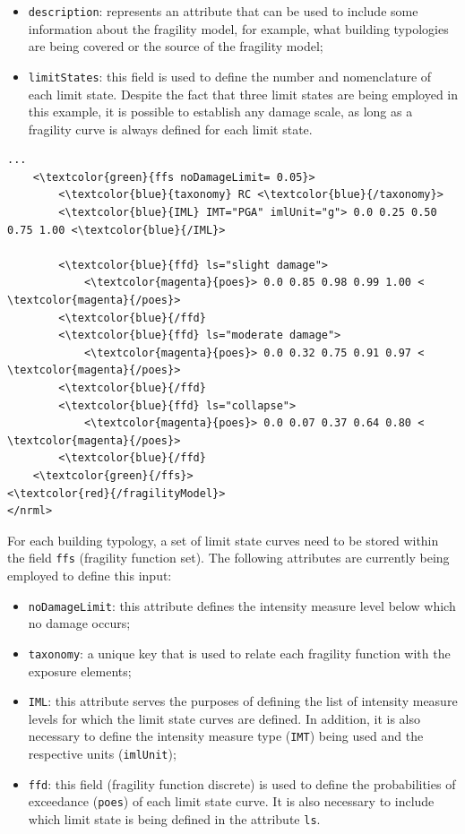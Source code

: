 \begin{itemize}
\item  \Verb+description+: represents an attribute that can be used to include  some information about the fragility model, for example, what building typologies are being covered or the source of the fragility model;
\item  \Verb+limitStates+: this field is used to define the number and nomenclature of each limit state. Despite the fact that three limit states are being employed in this example, it is possible to establish any damage scale, as long as a fragility curve is always defined for each limit state. 
\end{itemize}
    
\begin{Verbatim}[frame=single, commandchars=\\\{\}, samepage=true]
    ...  
    <\textcolor{green}{ffs noDamageLimit= 0.05}> 
        <\textcolor{blue}{taxonomy} RC <\textcolor{blue}{/taxonomy}>
        <\textcolor{blue}{IML} IMT="PGA" imlUnit="g"> 0.0 0.25 0.50 0.75 1.00 <\textcolor{blue}{/IML}>
        
        <\textcolor{blue}{ffd} ls="slight damage">
            <\textcolor{magenta}{poes}> 0.0 0.85 0.98 0.99 1.00 < \textcolor{magenta}{/poes}>
        <\textcolor{blue}{/ffd}
        <\textcolor{blue}{ffd} ls="moderate damage">
            <\textcolor{magenta}{poes}> 0.0 0.32 0.75 0.91 0.97 < \textcolor{magenta}{/poes}>
        <\textcolor{blue}{/ffd}
        <\textcolor{blue}{ffd} ls="collapse">
            <\textcolor{magenta}{poes}> 0.0 0.07 0.37 0.64 0.80 < \textcolor{magenta}{/poes}>
        <\textcolor{blue}{/ffd}      
    <\textcolor{green}{/ffs}> 
<\textcolor{red}{/fragilityModel}>  
</nrml>      
\end{Verbatim}

For each building typology, a set of limit state curves need to be stored within the field \Verb+ffs+ (fragility function set). The following attributes are currently being employed to define this input:

\begin{itemize}
\item  \Verb+noDamageLimit+: this attribute defines the intensity measure level below which no damage occurs;  
\item  \Verb+taxonomy+: a unique key that is used to relate each fragility function with the exposure elements; 
\item  \Verb+IML+: this attribute serves the purposes of defining the list of intensity measure levels for which the limit state curves are defined. In addition, it is also necessary to define the intensity measure type (\Verb+IMT+) being used and the respective units (\Verb+imlUnit+);
\item  \Verb+ffd+: this field (fragility function discrete) is used to define the probabilities of exceedance (\Verb+poes+) of each limit state curve. It is also necessary to include which limit state is being defined in the attribute \Verb+ls+.
\end{itemize}

